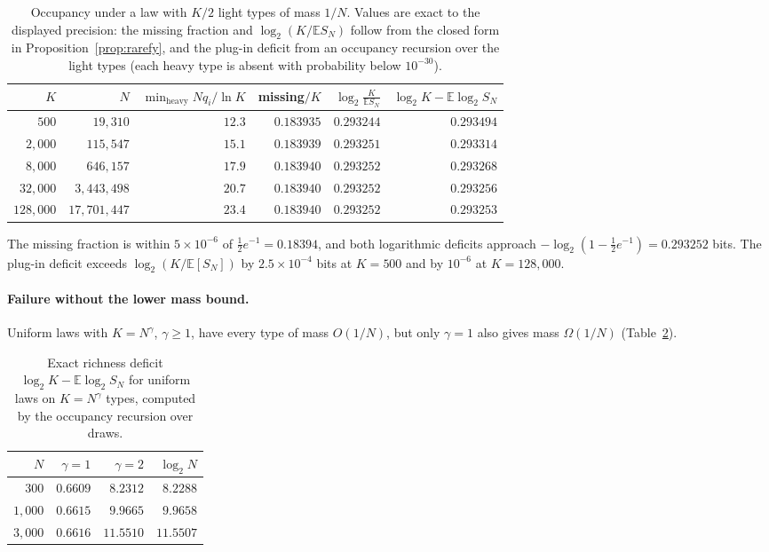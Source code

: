 \documentclass[10pt]{article}
\theoremstyle{plain}
\theoremstyle{definition}
\newcommand{\E}{\mathbb{E}}
\begin{document}
\begin{table}[ht]
\centering\small
\caption{Occupancy under a law with $K/2$ light types of mass $1/N$. Values are exact to the displayed precision: the
missing fraction and $\log_2(K/\E S_N)$ follow from the closed form in
Proposition~\ref{prop:rarefy}, and the plug-in deficit from an occupancy recursion over the light
types (each heavy type is absent with probability below $10^{-30}$).}
\label{tab:factorial}
\begin{tabular}{rrrrrr}
\toprule
$K$ & $N$ & $\min_{\mathrm{heavy}} Nq_i/\ln K$ & missing$/K$ & $\log_2\frac{K}{\mathbb{E}S_N}$ & $\log_2 K-\mathbb{E}\log_2 S_N$ \\
\midrule
$500$ & $19{,}310$ & $12.3$ & $0.183935$ & $0.293244$ & $0.293494$ \\
$2{,}000$ & $115{,}547$ & $15.1$ & $0.183939$ & $0.293251$ & $0.293314$ \\
$8{,}000$ & $646{,}157$ & $17.9$ & $0.183940$ & $0.293252$ & $0.293268$ \\
$32{,}000$ & $3{,}443{,}498$ & $20.7$ & $0.183940$ & $0.293252$ & $0.293256$ \\
$128{,}000$ & $17{,}701{,}447$ & $23.4$ & $0.183940$ & $0.293252$ & $0.293253$ \\
\bottomrule
\end{tabular}
\end{table}

The missing fraction is within $5\times10^{-6}$ of $\tfrac12 e^{-1}=0.18394$, and both logarithmic
deficits approach $-\log_2(1-\tfrac12e^{-1})=0.293252$ bits. The plug-in deficit exceeds
$\log_2(K/\E[S_N])$ by $2.5\times10^{-4}$ bits at $K=500$ and by $10^{-6}$ at
$K=128{,}000$.

\paragraph{Failure without the lower mass bound.} Uniform laws with $K=N^{\gamma}$, $\gamma\ge1$, have every type
of mass $O(1/N)$, but only $\gamma=1$ also gives mass $\Omega(1/N)$ (Table~\ref{tab:uniformdef}).

\begin{table}[ht]
\centering\small
\caption{Exact richness deficit $\log_2 K-\E\log_2 S_N$ for uniform laws on $K=N^\gamma$ types,
computed by the occupancy recursion over draws.}
\label{tab:uniformdef}
\begin{tabular}{rrrr}
\toprule
$N$ & $\gamma=1$ & $\gamma=2$ & $\log_2 N$ \\
\midrule
$300$ & $0.6609$ & $8.2312$ & $8.2288$ \\
$1{,}000$ & $0.6615$ & $9.9665$ & $9.9658$ \\
$3{,}000$ & $0.6616$ & $11.5510$ & $11.5507$ \\
\bottomrule
\end{tabular}
\end{table}
\end{document}
